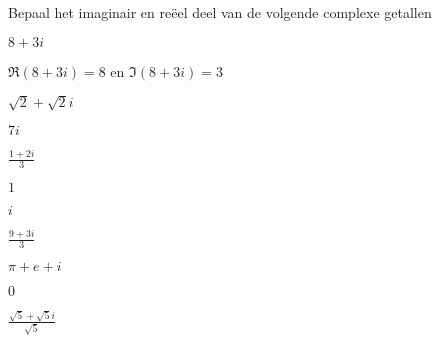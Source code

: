 \documentclass{ximera}
\begin{document}
\begin{exercise}{Bepaal het imaginair en reëel deel van de volgende complexe getallen}
\begin{xmmulticols}[4]
\begin{question}
    \(8+3i\)
    \begin{oplossing} \(\Re(8+3i) = 8\) en \(\Im(8+3i) = 3\)\end{oplossing}

\end{question}

\begin{question}
    \(\sqrt{2} + \sqrt{2}i\)
\end{question}
\begin{question}
    \(7i\)
\end{question}
\begin{question}
    \(\frac{1+2i}{3}\)
\end{question}
\begin{question}
    \(1\)
\end{question}
\begin{question}
\(i\)
\end{question}
\begin{question}
    \(\frac{9+3i}{3}\)
\end{question}
\begin{question}
    \(\pi + e + i \)
\end{question}
\begin{question}
    \(0\)
\end{question}
\begin{question}
    \(\frac{\sqrt{5} + \sqrt{5}i }{\sqrt{5}}\)
\end{question}

\end{xmmulticols}

\end{exercise}
\end{document}
